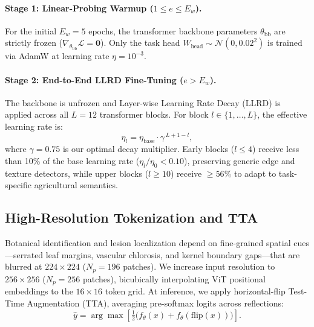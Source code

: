 \documentclass[10pt,twocolumn,letterpaper]{article}
\begin{document}
\paragraph{Stage 1: Linear-Probing Warmup ($1 \leq e \leq E_w$).}
For the initial $E_w = 5$ epochs, the transformer backbone parameters $\theta_{\mathrm{bb}}$ are strictly frozen ($\nabla_{\theta_{\mathrm{bb}}}\mathcal{L} = \mathbf{0}$). Only the task head $W_{\mathrm{head}} \sim \mathcal{N}(0, 0.02^2)$ is trained via AdamW at learning rate $\eta = 10^{-3}$.

\paragraph{Stage 2: End-to-End LLRD Fine-Tuning ($e > E_w$).}
The backbone is unfrozen and Layer-wise Learning Rate Decay (LLRD) is applied across all $L = 12$ transformer blocks. For block $l \in \{1,\ldots,L\}$, the effective learning rate is:
\begin{equation}
  \eta_l = \eta_{\mathrm{base}} \cdot \gamma^{\,L+1-l},
  \label{eq:llrd}
\end{equation}
where $\gamma = 0.75$ is our optimal decay multiplier. Early blocks ($l \le 4$) receive less than 10\% of the base learning rate ($\eta_l/\eta_0 < 0.10$), preserving generic edge and texture detectors, while upper blocks ($l \ge 10$) receive $\ge 56\%$ to adapt to task-specific agricultural semantics.

\subsection{High-Resolution Tokenization and TTA}
\label{sec:resolution}

Botanical identification and lesion localization depend on fine-grained spatial cues—serrated leaf margins, vascular chlorosis, and kernel boundary gaps—that are blurred at $224\times224$ ($N_p = 196$ patches). We increase input resolution to $256\times256$ ($N_p = 256$ patches), bicubically interpolating ViT positional embeddings to the $16\times16$ token grid. At inference, we apply horizontal-flip Test-Time Augmentation (TTA), averaging pre-softmax logits across reflections:
\begin{equation}
  \hat{y}
  = \arg\max\!\left[
    \tfrac{1}{2}\bigl(f_\theta(x) + f_\theta(\mathrm{flip}(x))\bigr)
  \right].
  \label{eq:tta}
\end{equation}

\end{document}

